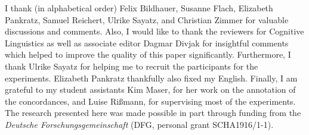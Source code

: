 \documentclass[UKenglish]{article}
\begin{document}
\begin{acknowledgement}
  I thank (in alphabetical order) Felix Bildhauer, Susanne Flach, Elizabeth Pankratz, Samuel Reichert, Ulrike Sayatz, and Christian Zimmer for valuable discussions and comments.
  Also, I would like to thank the reviewers for Cognitive Linguistics as well as associate editor Dagmar Divjak for insightful comments which helped to improve the quality of this paper significantly.
  Furthermore, I thank Ulrike Sayatz for helping me to recruit the participants for the experiments.
  Elizabeth Pankratz thankfully also fixed my English.
  Finally, I am grateful to my student assistants Kim Maser, for her work on the annotation of the concordances, and Luise Rißmann, for supervising most of the experiments.
  The research presented here was made possible in part through funding from the \textit{Deutsche Forschungsgemeinschaft} (DFG, personal grant SCHA1916/1-1).
\end{acknowledgement}



\end{document}
